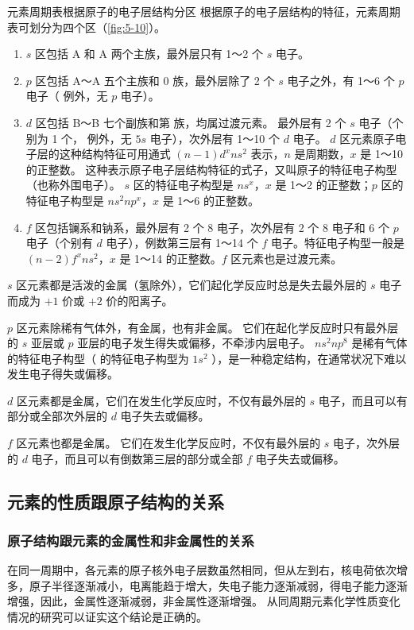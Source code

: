 \begin{Reading}{元素周期表根据原子的电子层结构分区}
根据原子的电子层结构的特征，元素周期表可划分为四个区（\cref{fig:5-10}）。

\begin{enumerate}
  \item $s$ 区包括 A 和 A 两个主族，最外层只有 1～2 个 $s$ 电子。
  \item $p$ 区包括 A～A 五个主族和 0 族，最外层除了 2 个 $s$ 电子之外，有 1～6 个 $p$ 电子（ 例外，无 $p$ 电子）。
  \item $d$ 区包括 B～B 七个副族和第  族，均属过渡元素。
  最外层有 2 个 $s$ 电子（个别为 1 个， 例外，无 $5s$ 电子），次外层有 1～10 个 $d$ 电子。 $d$ 区元素原子电子层的这种结构特征可用通式 $(n-1)d^xns^2$ 表示，$n$ 是周期数，$x$ 是 1～10 的正整数。
  这种表示原子电子层结构特征的式子，又叫原子的特征电子构型（也称外围电子）。
  $s$ 区的特征电子构型是 $ns^x$，$x$ 是 1～2 的正整数；$p$ 区的特征电子构型是 $ns^2np^x$，$x$ 是 1～6 的正整数。
  \item $f$ 区包括镧系和钠系，最外层有 2 个 8 电子，次外层有 2 个 8 电子和 6 个 $p$ 电子（个别有 $d$ 电子），例数第三层有 1～14 个 $f$ 电子。特征电子构型一般是 $(n-2)f^xns^2$，$x$ 是 1～14 的正整数。$f$ 区元素也是过渡元素。
\end{enumerate}

$s$ 区元素都是活泼的金属（氢除外），它们起化学反应时总是失去最外层的 $s$ 电子而成为 $+1$ 价或 $+2$ 价的阳离子。

$p$ 区元素除稀有气体外，有金属，也有非金属。
它们在起化学反应时只有最外层的 $s$ 亚层或 $p$ 亚层的电子发生得失或偏移，不牵涉内层电子。
$ns^2np^8$ 是稀有气体的特征电子构型（ 的特征电子构型为 $1s^2$ ），是一种稳定结构，在通常状况下难以发生电子得失或偏移。

$d$ 区元素都是金属，它们在发生化学反应时，不仅有最外层的 $s$ 电子，而且可以有部分或全部次外层的 $d$ 电子失去或偏移。

$f$ 区元素也都是金属。
它们在发生化学反应时，不仅有最外层的 $s$ 电子，次外层的 $d$ 电子，而且可以有倒数第三层的部分或全部 $f$ 电子失去或偏移。
\end{Reading}

\subsection{元素的性质跟原子结构的关系}
\subsubsection{原子结构跟元素的金属性和非金属性的关系}
在同一周期中，各元素的原子核外电子层数虽然相同，但从左到右，核电荷依次增多，原子半径逐渐减小，电离能趋于增大，失电子能力逐渐减弱，得电子能力逐渐增强，因此，金属性逐渐减弱，非金属性逐渐增强。
从同周期元素化学性质变化情况的研究可以证实这个结论是正确的。

